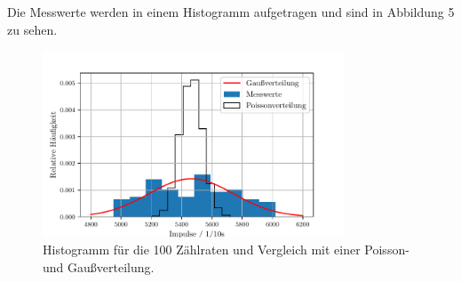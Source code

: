 Die Messwerte werden in einem Histogramm aufgetragen und sind in Abbildung 5 zu sehen.
\begin{figure}[H]
  \centering
  \includegraphics[width=0.8\textwidth]{stats.pdf}
  \caption{Histogramm für die 100 Zählraten und Vergleich mit einer Poisson- und Gaußverteilung. }
  \label{fig:plot}
\end{figure}